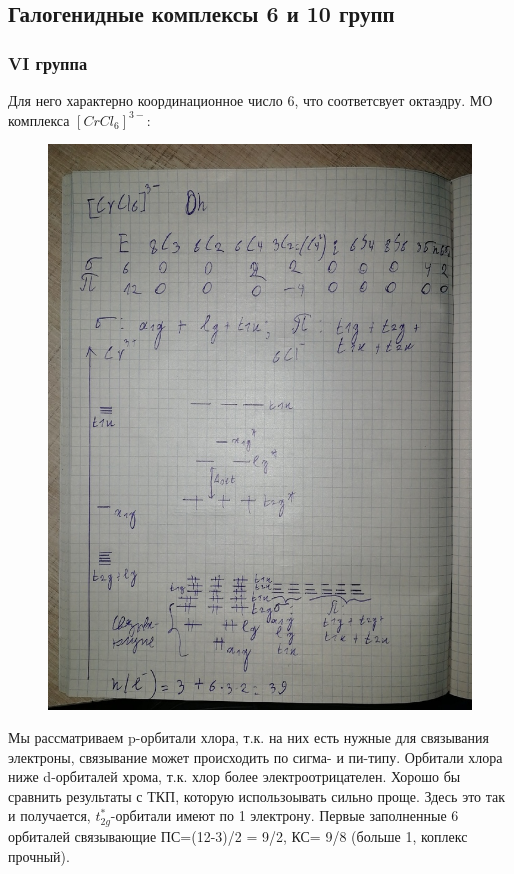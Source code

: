 \subsection{Галогенидные комплексы 6 и 10 групп}

\subsubsection*{VI группа}
Для него характерно координационное число 6, что соответсвует октаэдру. МО комплекса $[CrCl_6]^{3-}$:

\begin{figure}[H]
\centering
\includegraphics[scale=.300]{images/halogenides.jpg}
\end{figure}

Мы рассматриваем p-орбитали хлора, т.к. на них есть нужные для связывания электроны, связывание может происходить по сигма- и пи-типу.  Орбитали хлора ниже d-орбиталей хрома, т.к. хлор более электроотрицателен. Хорошо бы сравнить результаты с ТКП, которую использоывать сильно проще. Здесь это так и получается, $t_{2g}^*$-орбитали имеют по 1 электрону. Первые заполненные 6 орбиталей связывающие  ПС=(12-3)/2 = 9/2, КС= 9/8 (больше 1, коплекс прочный). 

